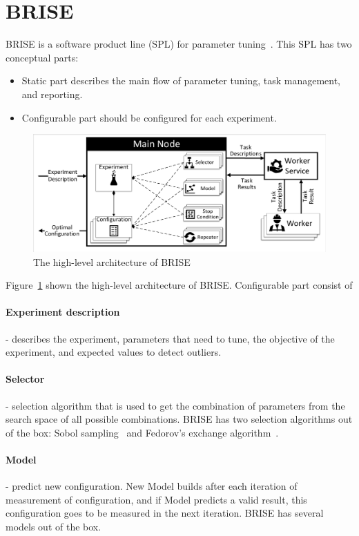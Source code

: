 \section{BRISE}
BRISE is a software product line (SPL) for parameter tuning~\cite{pukhkaiev19}.
This SPL has two conceptual parts:
\begin{itemize}
	\item Static part describes the main flow of parameter tuning, task management, and reporting.
	\item Configurable part should be configured for each experiment.
\end{itemize}

\begin{figure}
	\centering
	\includegraphics[width=\textwidth]{images/BRISEarch.pdf}
	\caption[The high-level architecture of BRISE]{The high-level architecture of BRISE}
	\label{fig:BRISEarch}
\end{figure}

Figure~\ref{fig:BRISEarch} shown the high-level architecture of BRISE.
Configurable part consist of 
	\paragraph{Experiment description} - describes the experiment, parameters that need to tune, the objective of the experiment, and expected values to detect outliers.
	\paragraph{Selector} - selection algorithm that is used to get the combination of parameters from the search space of all possible combinations. BRISE has two selection algorithms out of the box: Sobol sampling~\cite{sobol99} and Fedorov's exchange algorithm~\cite{fedorov13}. 
	\paragraph{Model} - predict new configuration. New Model builds after each iteration of measurement of configuration, and if Model predicts a valid result, this configuration goes to be measured in the next iteration. BRISE has several models out of the box.
